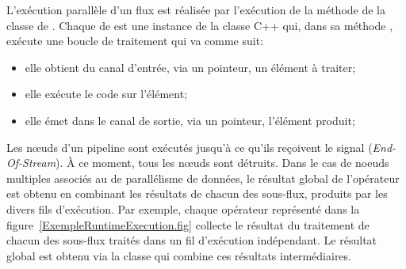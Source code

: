 
L'ex\'ecution parall\`ele d'un flux est r\'ealis\'ee par l'ex\'ecution de la m\'ethode  de la classe  de . Chaque  de  est une instance de la classe C++  qui, dans sa m\'ethode ,  ex\'ecute une boucle de traitement qui va comme suit:
\begin{itemize}
	\item elle obtient du canal d'entr\'ee, via un pointeur, un \'el\'ement \`a traiter;
	\item elle ex\'ecute le code sur l'\'el\'ement;
	\item elle \'emet dans le canal de sortie,  via un pointeur,  l'\'el\'ement produit;
\end{itemize}

Les nœuds d'un pipeline sont ex\'ecut\'es jusqu'\`a ce qu'ils re\c coivent le signal  (\emph{End-Of-Stream}). \`A ce moment, tous les nœuds sont d\'etruits. Dans le cas de noeuds multiples associ\'es au de parall\'elisme de donn\'ees, le r\'esultat global de l'op\'erateur est obtenu en combinant les r\'esultats de chacun des sous-flux, produits par les divers fils d'ex\'ecution. Par exemple, chaque op\'erateur  repr\'esent\'e dans la figure~\ref{ExempleRuntimeExecution.fig} collecte le r\'esultat du traitement de chacun des sous-flux trait\'es dans un fil d'ex\'ecution ind\'ependant. Le r\'esultat global est obtenu via la classe  qui combine ces r\'esultats interm\'ediaires.
